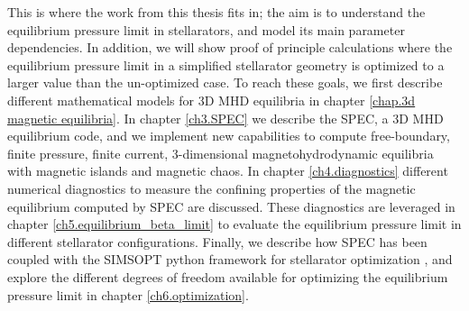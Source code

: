 \documentclass[my_thesis.tex]{subfiles}
\begin{document}
This is where the work from this thesis fits in; the aim  is to  understand the equilibrium pressure limit in stellarators, and model its main parameter dependencies. In addition, we will show proof of principle calculations where the equilibrium pressure limit in a simplified stellarator geometry is optimized to a larger value than the un-optimized case. To reach these goals, we first describe different mathematical models for 3D MHD equilibria in chapter \ref{chap.3d magnetic equilibria}. In chapter \ref{ch3.SPEC} we describe the \ac{SPEC}, a 3D MHD equilibrium code, and we implement new capabilities to compute free-boundary, finite pressure, finite current, 3-dimensional magnetohydrodynamic equilibria with magnetic islands and magnetic chaos. In chapter \ref{ch4.diagnostics} different numerical diagnostics to measure the confining properties of the magnetic equilibrium computed by SPEC are discussed. These diagnostics are leveraged in chapter \ref{ch5.equilibrium_beta_limit} to evaluate the equilibrium pressure limit in different stellarator configurations. Finally, we describe how \ac{SPEC} has been coupled with the SIMSOPT python framework for stellarator optimization \citep{Landreman2021b}, and explore the different degrees of freedom available for optimizing the equilibrium pressure limit in chapter \ref{ch6.optimization}.


\end{document}
